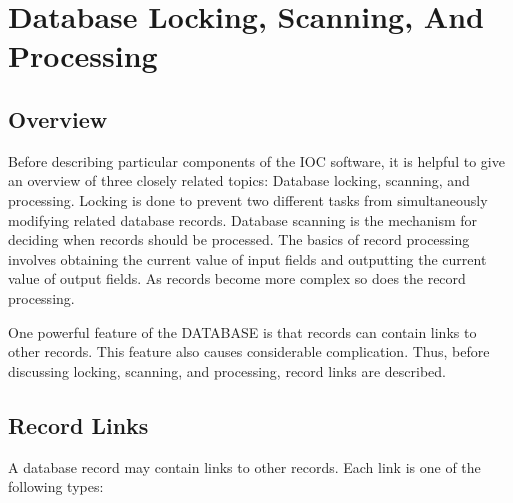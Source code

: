 \chapter{Database Locking, Scanning, And Processing}

\section{Overview}

Before describing particular components of the IOC software, it is helpful to give an overview of three closely related 
topics: Database locking, scanning, and processing. Locking is done to prevent two different tasks from simultaneously 
modifying related database records. Database scanning is the mechanism for deciding when records should be processed. 
The basics of record processing  involves obtaining the current value of  input fields and outputting the current value of 
output fields. As records become more complex so does the record processing.

One powerful feature of the DATABASE is that records can contain links to other records. This feature also causes 
considerable complication. Thus, before discussing locking, scanning, and processing, record links are described.

\section{Record Links}

A database record may contain links to other records. Each link is one of the following types:

